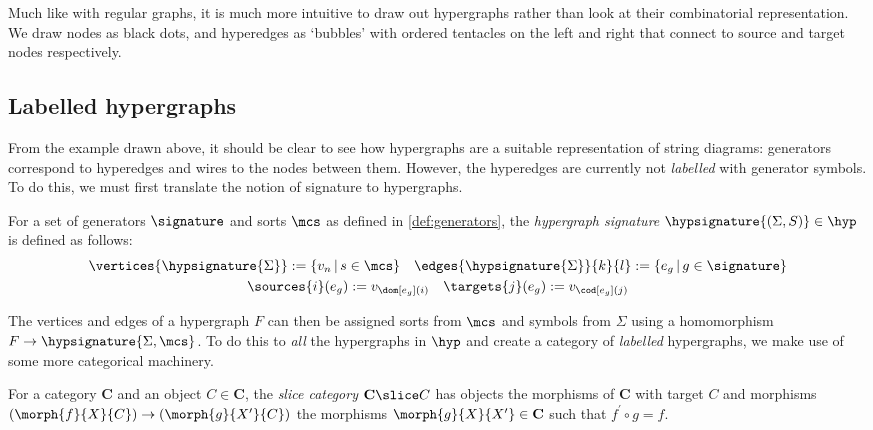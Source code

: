 Much like with regular graphs, it is much more intuitive to draw out hypergraphs
rather than look at their combinatorial representation.
We draw nodes as black dots, and hyperedges as `bubbles' with ordered tentacles
on the left and right that connect to source and target nodes respectively.

\begin{example}
\end{example}

\subsection{Labelled hypergraphs}

From the example drawn above, it should be clear to see how hypergraphs are a
suitable representation of string diagrams: generators correspond to hyperedges
and wires to the nodes between them.
However, the hyperedges are currently not \emph{labelled} with generator
symbols.
To do this, we must first translate the notion of signature to hypergraphs.

\begin{definition}
    For a set of generators \(\signature\) and sorts \(\mcs\) as defined
    in \cref{def:generators}, the \emph{hypergraph signature}
    \(\hypsignature{(\Sigma, S)} \in \hyp\) is defined as follows:
    \begin{gather*}
        \vertices{\hypsignature{\Sigma}} := \{ v_n \,|\, s \in \mcs\}
        \quad
        \edges{\hypsignature{\Sigma}}{k}{l} := \{ e_g \,|\, g \in \signature\}
        \\
        \sources{i}(e_g) := v_{\dom[e_g](i)}
        \quad
        \targets{j}(e_g) := v_{\cod[e_g](j)}
    \end{gather*}
\end{definition}

\begin{example}
\end{example}

The vertices and edges of a hypergraph \(F\) can then be assigned sorts from
\(\mcs\) and symbols from \(\Sigma\) using a homomorphism
\(F \to \hypsignature{\Sigma,\mcs}\).
To do this to \emph{all} the hypergraphs in \(\hyp\) and create a category of
\emph{labelled} hypergraphs, we make use of some more categorical machinery.

\begin{definition}
    For a category \(\mathbf{C}\) and an object \(C \in \mathbf{C}\), the
    \emph{slice category} \(\mathbf{C} \slice C\) has objects the morphisms of
    \(\mathbf{C}\) with target \(C\) and morphisms
    \((\morph{f}{X}{C}) \to (\morph{g}{X^\prime}{C})\) the morphisms
    \(\morph{g}{X}{X^\prime} \in \mathbf{C}\) such that \(f^\prime\circ g = f\).
\end{definition}

